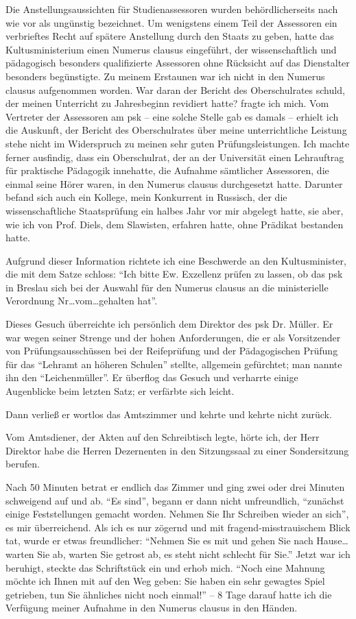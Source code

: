Die Anstellungsaussichten für Studienassessoren wurden behördlicherseits nach wie vor als ungünstig bezeichnet. Um wenigstens einem Teil der Assessoren ein verbrieftes Recht auf spätere Anstellung durch den Staats zu geben, hatte das Kultusministerium einen Numerus clausus eingeführt, der wissenschaftlich und pädagogisch besonders qualifizierte Assessoren ohne Rücksicht auf das Dienstalter besonders begünstigte. Zu meinem Erstaunen war ich nicht in den Numerus clausus aufgenommen worden. War daran der Bericht des Oberschulrates schuld, der meinen Unterricht zu Jahresbeginn revidiert hatte? fragte ich mich. Vom Vertreter der Assessoren am \ac{psk} -- eine solche Stelle gab es damals -- erhielt ich die Auskunft, der Bericht des Oberschulrates über meine unterrichtliche Leistung stehe nicht im Widerspruch zu meinen sehr guten Prüfungsleistungen. Ich machte ferner ausfindig, dass ein Oberschulrat, der an der Universität einen Lehrauftrag für praktische Pädagogik innehatte, die Aufnahme sämtlicher Assessoren, die einmal seine Hörer waren, in den Numerus clausus durchgesetzt hatte. Darunter befand sich auch ein Kollege, mein Konkurrent in Russisch, der die wissenschaftliche Staatsprüfung ein halbes Jahr vor mir abgelegt hatte, sie aber, wie ich von Prof. Diels, dem Slawisten, erfahren hatte, ohne Prädikat bestanden hatte.

Aufgrund dieser Information richtete ich eine Beschwerde an den Kultusminister, die mit dem Satze schloss: \enquote{Ich bitte Ew. Exzellenz prüfen zu lassen, ob das \ac{psk} in Breslau sich bei der Auswahl für den Numerus clausus an die ministerielle Verordnung Nr\dots vom\dots gehalten hat}.

Dieses Gesuch überreichte ich persönlich dem Direktor des \ac{psk} Dr. Müller. Er war wegen seiner Strenge und der hohen Anforderungen, die er als Vorsitzender von Prüfungsausschüssen bei der Reifeprüfung und der Pädagogischen Prüfung für das \enquote{Lehramt an höheren Schulen} stellte, allgemein gefürchtet; man nannte ihn den \enquote{Leichenmüller}. Er überflog das Gesuch und verharrte einige Augenblicke beim letzten Satz; er verfärbte sich leicht.

Dann verließ er wortlos das Amtszimmer und kehrte und kehrte nicht zurück.

Vom Amtsdiener, der Akten auf den Schreibtisch legte, hörte ich, der Herr Direktor habe die Herren Dezernenten in den Sitzungssaal zu einer Sondersitzung berufen.

Nach 50 Minuten betrat er endlich das Zimmer und ging zwei oder drei Minuten schweigend auf und ab. \enquote{Es sind}, begann er dann nicht unfreundlich, \enquote{zunächst einige Feststellungen gemacht worden. Nehmen Sie Ihr Schreiben wieder an sich}, es mir überreichend. Als ich es nur zögernd und mit fragend-misstrauischem Blick tat, wurde er etwas freundlicher: \enquote{Nehmen Sie es mit und gehen Sie nach Hause\dots warten Sie ab, warten Sie getrost ab, es steht nicht schlecht für Sie.} Jetzt war ich beruhigt, steckte das Schriftstück ein und erhob mich. \enquote{Noch eine Mahnung möchte ich Ihnen mit auf den Weg geben: Sie haben ein sehr gewagtes Spiel getrieben, tun Sie ähnliches nicht noch einmal!} -- 8 Tage darauf hatte ich die Verfügung meiner Aufnahme in den Numerus clausus in den Händen.

